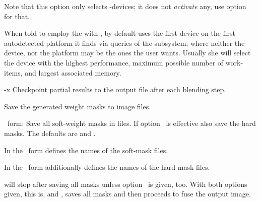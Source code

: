 \begin{codelist}
  Note that this option only selects -devices; it does not \emph{activate} any, use
  option~ for that.

  When told to employ the  with , by default \App{} uses the first
  device on the first autodetected platform it finds via queries of the 
  subsystem, where neither the device, nor the platform may be the ones the user wants.  Usually
  she will select the device with the highest performance, maximum possible number of
  work-items, and largest associated memory.


\ifenblend
    \label{opt:x}%
  \item[-x]
    Checkpoint partial results to the output file after each blending step.
\fi


\ifenfuse
    \label{opt:save-masks}%
  \item[\itempar{--save-masks~\textrm{(\oldstylefirst~form)}
      \\ --save-masks=\metavar{SOFT-MASK-TEMPLATE}~\textrm{(\oldstylesecond~form)}
      \\ --save-masks=\metavar{SOFT-MASK-TEMPLATE}:\feasiblebreak
      \metavar{HARD-MASK-TEMPLATE}~\textrm{(\oldstylethird~form)}}]\itemend
    Save the generated weight masks to image files.

    \begin{sloppypar}
      \oldstylefirst~form: Save all soft-weight masks in files.  If
      option~ is effective also save the hard
      masks.  The defaults are  and
      .

      In the \oldstylesecond~form  defines the names of
      the soft-mask files.

      In the \oldstylethird~form  additionally defines the
      names of the hard-mask files.
    \end{sloppypar}

    \App{} will stop after saving all masks unless
    option~ is given, too.  With both options given,
    this is,  and , \App{} saves all masks and then
    proceeds to fuse the output image.


\end{codelist}
